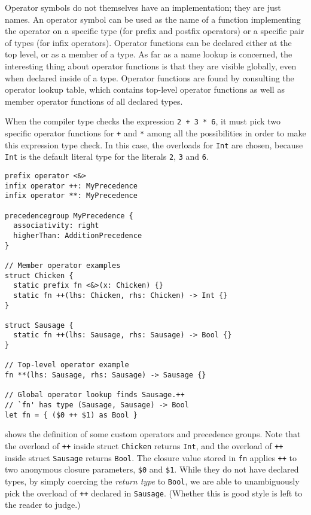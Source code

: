 \documentclass[../generics]{subfiles}
\begin{document}
Operator symbols do not themselves have an implementation; they are just names. An operator symbol can be used as the name of a function implementing the operator on a specific type (for prefix and postfix operators) or a specific pair of types (for infix operators). Operator functions can be declared either at the top level, or as a member of a type. As far as a name lookup is concerned, the interesting thing about operator functions is that they are visible globally, even when declared inside of a type. Operator functions are found by consulting the operator lookup table, which contains top-level operator functions as well as member operator functions of all declared types.

When the compiler type checks the expression \texttt{2 + 3 * 6}, it must pick two specific operator functions for \texttt{+} and \texttt{*} among all the possibilities in order to make this expression type check. In this case, the overloads for \texttt{Int} are chosen, because \texttt{Int} is the default literal type for the literals \texttt{2}, \texttt{3} and \texttt{6}.

\begin{listing}\label{customops}
\begin{Verbatim}
prefix operator <&>
infix operator ++: MyPrecedence
infix operator **: MyPrecedence

precedencegroup MyPrecedence {
  associativity: right
  higherThan: AdditionPrecedence
}

// Member operator examples
struct Chicken {
  static prefix fn <&>(x: Chicken) {}
  static fn ++(lhs: Chicken, rhs: Chicken) -> Int {}
}

struct Sausage {
  static fn ++(lhs: Sausage, rhs: Sausage) -> Bool {}
}

// Top-level operator example
fn **(lhs: Sausage, rhs: Sausage) -> Sausage {}

// Global operator lookup finds Sausage.++
// `fn' has type (Sausage, Sausage) -> Bool
let fn = { ($0 ++ $1) as Bool }
\end{Verbatim}
\end{listing}
 shows the definition of some custom operators and precedence groups. Note that the overload of \texttt{++} inside struct \texttt{Chicken} returns \texttt{Int}, and the overload of \texttt{++} inside struct \texttt{Sausage} returns \texttt{Bool}. The closure value stored in \texttt{fn} applies \texttt{++} to two anonymous closure parameters, \verb|$0| and \verb|$1|. While they do not have declared types, by simply coercing the \emph{return type} to \texttt{Bool}, we are able to unambiguously pick the overload of \texttt{++} declared in \texttt{Sausage}. (Whether this is good style is left to the reader to judge.)
\end{document}
